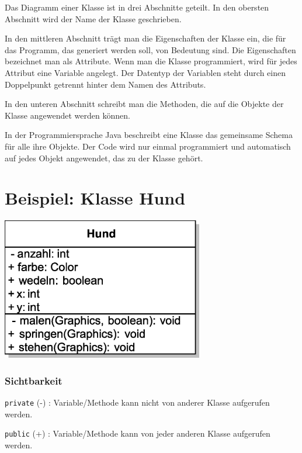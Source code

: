 Das Diagramm einer Klasse ist in drei Abschnitte geteilt. In den obersten
Abschnitt wird der Name der Klasse geschrieben.

In den mittleren Abschnitt trägt man die Eigenschaften der Klasse ein, die für
das Programm, das generiert werden soll, von Bedeutung sind. Die Eigenschaften
bezeichnet man als Attribute. Wenn man die Klasse programmiert, wird für jedes
Attribut eine Variable angelegt. Der Datentyp der Variablen steht durch einen
Doppelpunkt getrennt hinter dem Namen des Attributs.

In den unteren Abschnitt schreibt man die Methoden, die auf die Objekte der
Klasse angewendet werden können.

In der Programmiersprache Java beschreibt eine Klasse das gemeinsame Schema für
alle ihre Objekte. Der Code wird nur einmal programmiert und automatisch auf
jedes Objekt angewendet, das zu der Klasse gehört.


\section{Beispiel: Klasse Hund}

\begin{minipage}{0.5\textwidth}
\begin{center}
\includegraphics[width=0.66\textwidth]{./inf/SEKII/10_Java_Klassen/HundVorversion.eps}
\end{center}
\end{minipage}
\begin{minipage}{0.5\textwidth}
\subsubsection{Sichtbarkeit}

\lstinline|private| (-) : Variable/Methode kann
nicht von anderer Klasse aufgerufen
werden.

\lstinline|public| (+) : Variable/Methode kann
von jeder anderen Klasse aufgerufen
werden.
\end{minipage}

